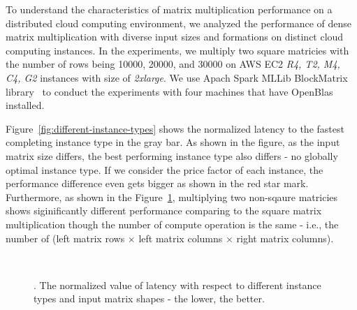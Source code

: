 \documentclass[10pt, conference, compsocconf]{IEEEtran}
\begin{document}
To understand the characteristics of matrix multiplication performance on a distributed cloud computing environment, we analyzed the performance of dense matrix multiplication with diverse input sizes and formations on distinct cloud computing instances. In the experiments, we multiply two square matricies with the number of rows being 10000, 20000, and 30000 on AWS EC2 \textit{R4, T2, M4, C4, G2} instances with size of \textit{2xlarge}. We use Apach Spark MLLib BlockMatrix library~\cite{spark-mm} to conduct the experiments with four machines that have OpenBlas installed. 

Figure~\ref{fig:different-instance-types} shows the normalized latency to the fastest completing instance type in the gray bar. As shown in the figure, as the input matrix size differs, the best performing instance type also differs - no globally optimal instance type. If we consider the price factor of each instance, the performance difference even gets bigger as shown in the red star mark. Furthermore, as shown in the Figure~\ref{fig:instance-blocks-sizes-compare}, multiplying two non-sqaure matricies shows siginificantly different performance comparing to the square matrix multiplication though the number of compute operation is the same - i.e., the number of (left matrix rows $\times$ left matrix columns $\times$ right matrix columns).

\begin{figure}[!ht]
  \centering
  \\
  \caption{\label{fig:instance-blocks-sizes-compare}. The normalized value of latency with respect to different instance types and input matrix shapes - the lower, the better.}
\end{figure}
\end{document}
